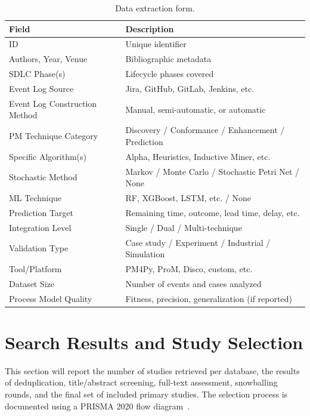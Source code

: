 \begin{table}[htbp]
\centering
\caption{Data extraction form.}
\label{tab:extraction}
\small
\begin{tabular}{lp{9cm}}
\toprule
\textbf{Field} & \textbf{Description} \\
\midrule
ID & Unique identifier \\
Authors, Year, Venue & Bibliographic metadata \\
SDLC Phase(s) & Lifecycle phases covered \\
Event Log Source & Jira, GitHub, GitLab, Jenkins, etc. \\
Event Log Construction Method & Manual, semi-automatic, or automatic \\
PM Technique Category & Discovery / Conformance / Enhancement / Prediction \\
Specific Algorithm(s) & Alpha, Heuristics, Inductive Miner, etc. \\
Stochastic Method & Markov / Monte Carlo / Stochastic Petri Net / None \\
ML Technique & RF, XGBoost, LSTM, etc. / None \\
Prediction Target & Remaining time, outcome, lead time, delay, etc. \\
Integration Level & Single / Dual / Multi-technique \\
Validation Type & Case study / Experiment / Industrial / Simulation \\
Tool/Platform & PM4Py, ProM, Disco, custom, etc. \\
Dataset Size & Number of events and cases analyzed \\
Process Model Quality & Fitness, precision, generalization (if reported) \\
\bottomrule
\end{tabular}
\end{table}


\section{Search Results and Study Selection}
\label{sec:slr-results-selection}


This section will report the number of studies retrieved per database, the results of deduplication, title/abstract screening, full-text assessment, snowballing rounds, and the final set of included primary studies. The selection process is documented using a PRISMA 2020 flow diagram~\cite{page2021}.

